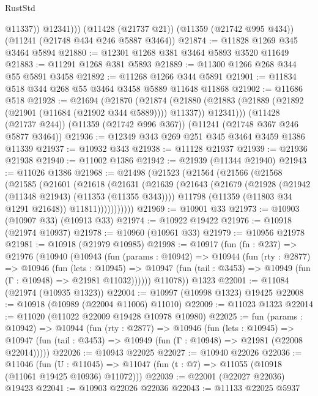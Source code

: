 \begin{lexlean}{RustStd}
\begin{coremodule}
{{{{{{{{{{{{{{{{{{{              @11337))
          @12341)))
    (@11428 (@21737 @21))
    (@11359 (@21742 @995 @434))
    (@11241 (@21748 @434 @246 @5887 @3464))
@21874 := @11828 @1269 @345 @3464 @5894
@21880 := @12301 @1268 @381 @3464 @5893 @3520 @11649
@21883 := @11291 @1268 @381 @5893
@21889 := @11300 @1266 @268 @344 @55 @5891 @3458
@21892 := @11268 @1266 @344 @5891
@21901 := @11834 @518 @344 @268 @55 @3464 @3458 @5889 @11648 @11868
@21902 := @11686 @518
@21928 := @21694
    (@21870
      (@21874
        (@21880 (@21883 (@21889 (@21892 (@21901 (@11684 (@21902 @344 @5889)))) @11337)) @12341)))
    (@11428 (@21737 @244))
    (@11359 (@21742 @996 @367))
    (@11241 (@21748 @367 @246 @5877 @3464))
@21936 := @12349 @343 @269 @251 @345 @3464 @3459 @1386 @11339
@21937 := @10932 @343
@21938 := @11128 @21937
@21939 := @21936 @21938
@21940 := @11002 @1386
@21942 := @21939 (@11344 @21940)
@21943 := @11026 @1386
@21968 := @21498
    (@21523
      (@21564
        (@21566
          (@21568
            (@21585
              (@21601
                (@21618
                  (@21631
                    (@21639
                      (@21643
                        (@21679
                          (@21928 (@21942 (@11348 @21943) (@11353 (@11355 @343))))
                          @11798
                          (@11359 (@11803 @34 @1291 @21648))
                          @11811)))))))))))
@21969 := @10901 @33
@21973 := @10903 (@10907 @33) (@10913 @33)
@21974 := @10922 @19422
@21976 := @10918 (@21974 @10937)
@21978 := @10960 (@10961 @33)
@21979 := @10956 @21978
@21981 := @10918 (@21979 @10985)
@21998 := @10917
    (fun (fn : @237) =>
    @21976
      (@10940
        (@10943
          (fun (params : @10942) =>
          @10944
            (fun (rty : @2877) =>
            @10946
              (fun (lets : @10945) =>
              @10947 (fun (tail : @3453) => @10949 (fun (Γ : @10948) => @21981 @11032))))))
        @11078))
    @1323
@22001 := @11084 (@21974 (@10935 @1323))
@22004 := @10997 (@10998 @1323) @19425
@22008 := @10918 (@10989 (@22004 @11006) @11010)
@22009 := @11023 @1323
@22014 := @11020 (@11022 @22009 @19428 @10978 @10980)
@22025 := fun (params : @10942) =>
  @10944
    (fun (rty : @2877) =>
    @10946
      (fun (lets : @10945) =>
      @10947 (fun (tail : @3453) => @10949 (fun (Γ : @10948) => @21981 (@22008 @22014)))))
@22026 := @10943 @22025
@22027 := @10940 @22026
@22036 := @11046
    (fun (U : @11045) => @11047 (fun (t : @7) => @11055 (@10918 (@11061 @19425 @10936) @11072)))
@22039 := @22001 (@22027 @22036) @19423
@22041 := @10903 @22026 @22036
@22043 := @11133 @22025 @5937
}}}}}}}}}}}}}}}}}}}
\end{coremodule}
\end{lexlean}
